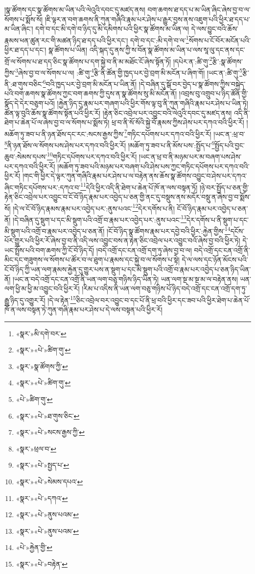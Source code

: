 །སྣ་ཚོགས་དང་སྣ་ཚོགས་མ་ཡིན་པའི་ལེའུའི་དབང་དུ་མཛད་ནས། བག་ཆགས་ཐ་དད་པ་མ་ཡིན་ཞིང་ཞེས་བྱ་བ་ལ་སོགས་པ་སྨོས་སོ། །ཇི་ལྟར་ན་བག་ཆགས་ནི་ཀུན་གཞིའི་རྣམ་པར་ཤེས་པ་རྒྱུར་བྱས་ནས་འཇུག་པའི་ཕྱིར་ཐ་དད་པ་མ་ཡིན་ཞིང་། དགེ་བ་དང་མི་དགེ་བ་ཉིད་དུ་མི་དམིགས་པའི་ཕྱིར་སྣ་ཚོགས་མ་ཡིན་ལ། དེ་ལས་བྱུང་བའི་ཆོས་རྣམས་ཕན་ཚུན་རང་གི་མཚན་ཉིད་ཐ་དད་པའི་ཕྱིར་དང་། དགེ་བ་དང་:མི་དགེ་བ་ལ་\footnote{«སྣར་»མི་དགེ་བར་}སོགས་པ་ངོ་བོར་མངོན་པའི་ཕྱིར་ཐ་དད་པ་དང་། སྣ་ཚོགས་པ་ཡིན། འདི་སྐད་དུ་ནས་ཀྱི་ས་བོན་སྣ་ཚོགས་མ་ཡིན་པ་ལས་སཱ་ལུ་དང་ནས་དང་གྲོ་ལ་སོགས་པ་ཐ་དད་ཅིང་སྣ་ཚོགས་པ་དག་སྐྱེ་བ་ནི་མ་མཐོང་ངོ་ཞེས་སྟོན་ཏོ། །དཔེར་ན་:ཚི་གུ་\footnote{«སྣར་»«པེ་»ཚིག་གུ་}རྩི་:སྣ་ཚོགས་ཀྱིས་\footnote{«སྣར་»སྣ་ཚོགས་ཀྱི་}ཞེས་བྱ་བ་ལ་སོགས་པ་ལ། :ཚི་གུ་\footnote{«སྣར་»«པེ་»ཚིག་གུ་}རྩི་ནི་ཚོན་གྱི་ཁྱད་པར་བྱེ་བྲག་མི་མངོན་པ་ཞིག་གོ། །ཡང་ན་:ཚི་གུ་\footnote{«པེ་»ཚིག་གུ་}རྩི་ནི་:ཐ་གུས་བཅིང་\footnote{«སྣར་»«པེ་»ཐ་གུས་ཅིང་}བའི་ཁྱད་པར་བྱེ་བྲག་མི་མངོན་པ་ཡིན་ནོ། །དེ་བཞིན་དུ་སྒོ་བར་བྱེད་པ་སྣ་ཚོགས་ཀྱིས་བསྐྱེད་པའི་བག་ཆགས་སྣ་ཚོགས་ཀྱང་བག་ཆགས་ཀྱི་དུས་ན་སྣ་ཚོགས་སུ་མི་མངོན་ནོ། །འབྲས་བུ་འགྲུབ་པ་ཉིད་ཚོན་གྱི་སྣོད་དེ་དེར་བཅུག་པའོ། །རྐྱེན་ཉིད་དུ་རྣམ་པར་གཞག་པའི་ཕྱིར་གོས་ལྟ་བུ་ནི་ཀུན་གཞིའི་རྣམ་པར་ཤེས་པ་ཡིན་ཏེ། ཚོན་ལྟ་བུའི་ཆོས་སྣ་ཚོགས་སྟོན་པའི་ཕྱིར་རོ། །རྟེན་ཅིང་འབྲེལ་པར་འབྱུང་བའི་ལེའུའི་དབང་དུ་མཛད་ནས། འདི་ནི་ཐེག་པ་ཆེན་པོ་ལ་ཞེས་བྱ་བ་ལ་སོགས་པ་སྨོས་ཏེ། ཕྲ་བ་ནི་སོ་སོའི་སྐྱེ་བོ་རྣམས་ཀྱིས་ཤེས་པར་དཀའ་བའི་ཕྱིར་རོ། །མཆོག་ཏུ་ཟབ་པ་ནི་ཉན་ཐོས་དང་རང་:སངས་རྒྱས་ཀྱིས་\footnote{«སྣར་»«པེ་»སངས་རྒྱས་ཀྱི་}གཏིང་དཔོགས་པར་དཀའ་བའི་ཕྱིར་རོ། །ཡང་ན་:ཕྲ་བ་\footnote{«སྣར་»ཕྲལ་བ་}ནི་ཉན་ཐོས་ལ་སོགས་པས་ཤེས་པར་དཀའ་བའི་ཕྱིར་རོ། །མཆོག་ཏུ་ཟབ་པ་ནི་མོས་པས་:སྤྱོད་པ་\footnote{«སྣར་»«པེ་»སྤྱད་པ་}སྤྱོད་པའི་བྱང་ཆུབ་:སེམས་དཔས་\footnote{«སྣར་»«པེ་»སེམས་དཔའ་}གཏིང་དཔོགས་པར་དཀའ་བའི་ཕྱིར་རོ། །ཡང་ན་ཕྲ་བ་ནི་མཉམ་པར་མ་བཞག་པས་ཤེས་པར་དཀའ་བའི་ཕྱིར་རོ། །མཆོག་ཏུ་ཟབ་པའི་མཉམ་པར་བཞག་པའི་ཤེས་པས་ཀྱང་གཏིང་དཔོགས་པར་དཀའ་བའི་ཕྱིར་རོ། །གང་གི་ཕྱིར་དེ་ལྟར་ཀུན་གཞིའི་རྣམ་པར་ཤེས་པ་ལ་བརྟེན་ནས་ཆོས་སྣ་ཚོགས་འབྱུང་བ་ཤེས་པར་དཀའ་ཞིང་གཏིང་དཔོགས་པར་:དཀའ་བ་\footnote{«སྣར་»«པེ་»དཀའ་}དེའི་ཕྱིར་འདི་ནི་ཐེག་པ་ཆེན་པོ་ཁོ་ན་ལས་བསྟན་ཏོ། །ཉེ་བར་སྤྱོད་པ་ཅན་གྱི་རྟེན་ཅིང་འབྲེལ་པར་འབྱུང་བ་ངོ་བོ་ཉིད་རྣམ་པར་འབྱེད་པ་ཅན་གྱི་ནང་དུ་བསྡུས་ནས་མདོར་བསྡུ་ན་ཞེས་བྱ་བ་སྨོས་སོ། །དེ་ལ་ངོ་བོ་ཉིད་རྣམས་རྣམ་པར་འབྱེད་པར་:ནུས་པའང་\footnote{«སྣར་»«པེ་»ནུས་པའམ་}དེར་དགོས་པ་ནི། ངོ་བོ་ཉིད་རྣམ་པར་འབྱེད་པ་ཅན་ནོ། །དེ་བཞིན་དུ་སྡུག་པ་དང་མི་སྡུག་པའི་འགྲོ་བ་རྣམ་པར་འབྱེད་པར་:ནུས་པའང་\footnote{«སྣར་»«པེ་»ནུས་པའམ་}དེར་དགོས་པ་ནི་སྡུག་པ་དང་མི་སྡུག་པའི་འགྲོ་བ་རྣམ་པར་འབྱེད་པ་ཅན་ནོ། །ངོ་བོ་ཉིད་སྣ་ཚོགས་རྣམ་པར་དབྱེ་བའི་ཕྱིར་:རྐྱེན་གྱིས་\footnote{«པེ་»རྐྱེན་གྱི་}དངོས་པོར་གྱུར་པའི་ཕྱིར་རོ་ཞེས་བྱ་བ་ནི་འདི་ལས་འབྱུང་བས་ན་རྟེན་ཅིང་འབྲེལ་པར་འབྱུང་བའོ་ཞེས་བྱ་བའི་ཕྱིར་ཏེ། དེ་ཡང་སྤྲོས་པའི་བག་ཆགས་ཀྱི་ངོ་བོ་ཉིད་དོ། །བདེ་འགྲོ་དང་ངན་འགྲོ་དག་ཏུ་ཞེས་བྱ་བ་ལ། བདེ་འགྲོ་དང་ངན་འགྲོ་ནི་མིང་དང་གཟུགས་ལ་སོགས་པ་ཚོར་བ་ལ་ཐུག་པ་རྣམས་དང་སྐྱེ་བ་ལ་སོགས་པ་སྟེ། དེ་ལ་ལས་དང་ཉོན་མོངས་པའི་ངོ་བོ་ཉིད་ཀྱི་ཡན་ལག་རྣམས་རྐྱེན་དུ་གྱུར་པས་ན་སྡུག་པ་དང་མི་སྡུག་པའི་འགྲོ་བ་རྣམ་པར་འབྱེད་པ་ཅན་ཉིད་ཡིན་ནོ། །ཡང་ན་བདེ་འགྲོ་དང་ངན་འགྲོ་ནི་ཡན་ལག་བཅུ་གཉིས་ཉིད་ཡིན་ཏེ། ཡན་ལག་སྔ་མ་སྔ་མ་ལ་བརྟེན་ནས། ཡན་ལག་ཕྱི་མ་ཕྱི་མ་འབྱུང་བའི་ཕྱིར་རོ། །རིམ་པ་འདིས་ནི་ཡན་ལག་བཅུ་གཉིས་པོ་ཉིད་བདེ་འགྲོ་དང་ངན་འགྲོ་དག་ཏུ་རྒྱུ་ཉིད་དུ་འགྱུར་རོ། །དེ་ལ་རྟེན་\footnote{«སྣར་»«པེ་»བརྟེན་}ཅིང་འབྲེལ་བར་འབྱུང་བ་དང་པོ་ནི་ཕྲ་བའི་ཕྱིར་དང་ཟབ་པའི་ཕྱིར་ཐེག་པ་ཆེན་པོ་ཁོ་ན་ལས་བསྟན་ཏེ་ཀུན་གཞི་རྣམ་པར་ཤེས་པ་དེ་ལས་བསྟན་པའི་ཕྱིར་རོ། 